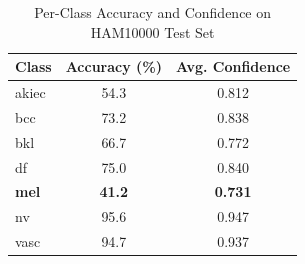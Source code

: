 \begin{table}[h]
\centering
\caption{Per-Class Accuracy and Confidence on HAM10000 Test Set}
\begin{tabular}{lcc}
\toprule
Class & Accuracy (\%) & Avg. Confidence \\
\midrule
akiec & 54.3 & 0.812 \\
bcc & 73.2 & 0.838 \\
bkl & 66.7 & 0.772 \\
df & 75.0 & 0.840 \\
\textbf{mel} & \textbf{41.2} & \textbf{0.731} \\
nv & 95.6 & 0.947 \\
vasc & 94.7 & 0.937 \\
\bottomrule
\end{tabular}
\label{tab:class_stratified}
\end{table}
